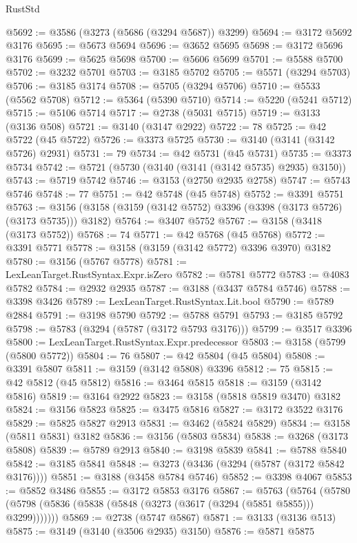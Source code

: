 \begin{lexlean}{RustStd}
\begin{coremodule}
@5692 := @3586 (@3273 (@5686 (@3294 @5687)) @3299)
@5694 := @3172 @5692 @3176
@5695 := @5673 @5694
@5696 := @3652 @5695
@5698 := @3172 @5696 @3176
@5699 := @5625 @5698
@5700 := @5606 @5699
@5701 := @5588 @5700
@5702 := @3232 @5701
@5703 := @3185 @5702
@5705 := @5571 (@3294 @5703)
@5706 := @3185 @3174
@5708 := @5705 (@3294 @5706)
@5710 := @5533 (@5562 @5708)
@5712 := @5364 (@5390 @5710)
@5714 := @5220 (@5241 @5712)
@5715 := @5106 @5714
@5717 := @2738 (@5031 @5715)
@5719 := @3133 (@3136 @508)
@5721 := @3140 (@3147 @2922)
@5722 := 78
@5725 := @42 @5722 (@45 @5722)
@5726 := @3373 @5725
@5730 := @3140 (@3141 (@3142 @5726) @2931)
@5731 := 79
@5734 := @42 @5731 (@45 @5731)
@5735 := @3373 @5734
@5742 := @5721 (@5730 (@3140 (@3141 (@3142 @5735) @2935) @3150))
@5743 := @5719 @5742
@5746 := @3153 (@2750 @2935 @2758)
@5747 := @5743 @5746
@5748 := 77
@5751 := @42 @5748 (@45 @5748)
@5752 := @3391 @5751
@5763 := @3156 (@3158 (@3159 (@3142 @5752) @3396 (@3398 (@3173 @5726) (@3173 @5735))) @3182)
@5764 := @3407 @5752
@5767 := @3158 (@3418 (@3173 @5752))
@5768 := 74
@5771 := @42 @5768 (@45 @5768)
@5772 := @3391 @5771
@5778 := @3158 (@3159 (@3142 @5772) @3396 @3970) @3182
@5780 := @3156 (@5767 @5778)
@5781 := LexLeanTarget.RustSyntax.Expr.isZero
@5782 := @5781 @5772
@5783 := @4083 @5782
@5784 := @2932 @2935
@5787 := @3188 (@3437 @5784 @5746)
@5788 := @3398 @3426
@5789 := LexLeanTarget.RustSyntax.Lit.bool
@5790 := @5789 @2884
@5791 := @3198 @5790
@5792 := @5788 @5791
@5793 := @3185 @5792
@5798 := @5783 (@3294 (@5787 (@3172 @5793 @3176)))
@5799 := @3517 @3396
@5800 := LexLeanTarget.RustSyntax.Expr.predecessor
@5803 := @3158 (@5799 (@5800 @5772))
@5804 := 76
@5807 := @42 @5804 (@45 @5804)
@5808 := @3391 @5807
@5811 := @3159 (@3142 @5808) @3396
@5812 := 75
@5815 := @42 @5812 (@45 @5812)
@5816 := @3464 @5815
@5818 := @3159 (@3142 @5816)
@5819 := @3164 @2922
@5823 := @3158 (@5818 @5819 @3470) @3182
@5824 := @3156 @5823
@5825 := @3475 @5816
@5827 := @3172 @3522 @3176
@5829 := @5825 @5827 @2913
@5831 := @3462 (@5824 @5829)
@5834 := @3158 (@5811 @5831) @3182
@5836 := @3156 (@5803 @5834)
@5838 := @3268 (@3173 @5808)
@5839 := @5789 @2913
@5840 := @3198 @5839
@5841 := @5788 @5840
@5842 := @3185 @5841
@5848 := @3273 (@3436 (@3294 (@5787 (@3172 @5842 @3176))))
@5851 := @3188 (@3458 @5784 @5746)
@5852 := @3398 @4067
@5853 := @5852 @3486
@5855 := @3172 @5853 @3176
@5867 := @5763
    (@5764 (@5780 (@5798 (@5836 (@5838 (@5848 (@3273 (@3617 (@3294 (@5851 @5855))) @3299)))))))
@5869 := @2738 (@5747 @5867)
@5871 := @3133 (@3136 @513)
@5875 := @3149 (@3140 (@3506 @2935) @3150)
@5876 := @5871 @5875

\end{coremodule}
\end{lexlean}
